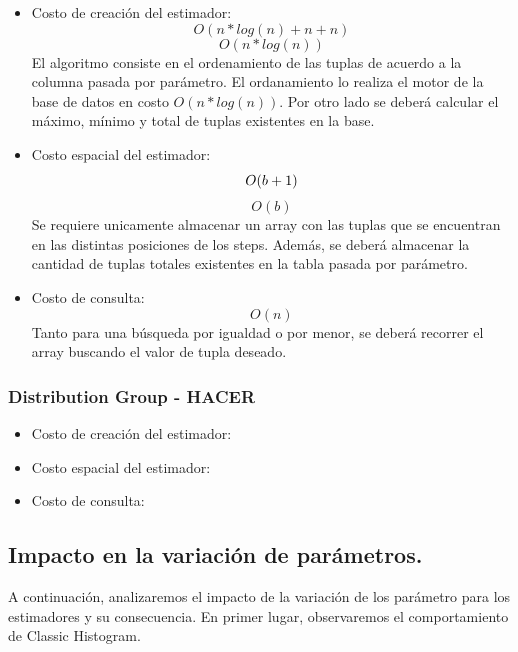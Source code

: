 \documentclass[10pt, a4paper,english,spanish,hidelinks]{article}
\begin{document}
\begin{itemize}

\item Costo de creación del estimador:
\begin{equation}
O(n*log(n) + n + n)
\end{equation}
\begin{equation}
O(n*log(n))
\end{equation}
El algoritmo consiste en el ordenamiento de las tuplas de acuerdo a la columna pasada por
parámetro. El ordanamiento lo realiza el motor de la base de datos en costo $O(n*log(n))$.
Por otro lado se deberá calcular el máximo, mínimo y total de tuplas existentes en la base.

\item Costo espacial del estimador:
\begin{equation}
O(b + 1) \\
\end{equation}
\begin{equation}
O(b)
\end{equation}
Se requiere unicamente almacenar un array con las tuplas que se encuentran en las distintas
posiciones de los steps. Además, se deberá almacenar la cantidad de tuplas totales
existentes en la tabla pasada por parámetro.

\item Costo de consulta:
\begin{equation}
O(n)
\end{equation}
Tanto para una búsqueda por igualdad o por menor, se deberá recorrer el array buscando
el valor de tupla deseado.

\end{itemize}

\subsubsection{Distribution Group - HACER}

\begin{itemize}
\item Costo de creación del estimador:
\item Costo espacial del estimador:
\item Costo de consulta:
\end{itemize}


\subsection{Impacto en la variación de parámetros.}
A continuación, analizaremos el impacto de la variación de los parámetro para los estimadores y su consecuencia. En primer lugar, observaremos el comportamiento de Classic Histogram. 
\end{document}
